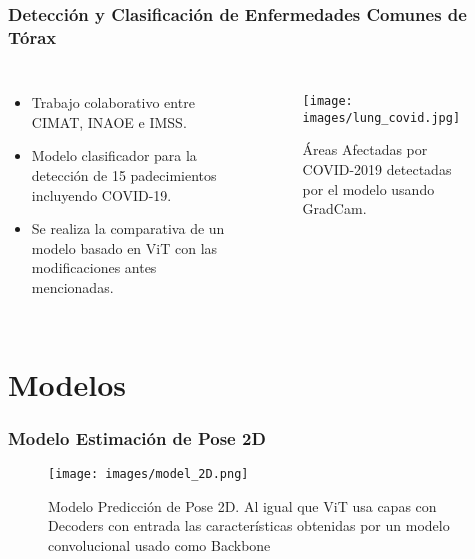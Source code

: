 \documentclass{beamer}
\begin{document}
\begin{frame}
\frametitle{Detección y Clasificación de Enfermedades Comunes de Tórax}


\begin{columns}
\begin{itemize}
    \item Trabajo colaborativo entre CIMAT, INAOE e IMSS.
    \item Modelo clasificador para la detección de 15
          padecimientos incluyendo COVID-19.
    \item Se realiza la comparativa de un modelo basado en ViT con las modificaciones antes
          mencionadas.
\end{itemize}

\begin{figure}[htbp]
    \centerline{\texttt{[image: images/lung\_covid.jpg]}}
    \caption{Áreas Afectadas por COVID-2019 detectadas por el modelo usando GradCam.}
    \label{fig:lung}
\end{figure}
\end{columns}

\end{frame}

\section{Modelos}

\begin{frame}
\frametitle{Modelo Estimación de Pose 2D}

\begin{figure}[htbp]
    \centerline{\texttt{[image: images/model\_2D.png]}}
    \caption{Modelo Predicción de Pose 2D. Al igual que ViT usa capas con Decoders con entrada las
             características obtenidas por un modelo convolucional usado como Backbone}
    \label{fig:m2d}
\end{figure}

\end{frame}
\end{document}

